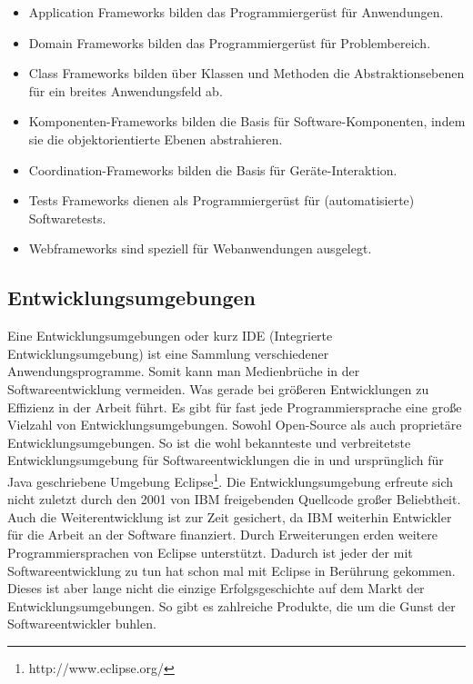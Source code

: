 \begin{itemize}
  \item Application Frameworks 
        \newline bilden das Programmiergerüst für Anwendungen.
  \item Domain Frameworks 
        \newline bilden das Programmiergerüst für Problembereich.
  \item Class Frameworks 
        \newline bilden über Klassen und Methoden die Abstraktionsebenen 
        für ein breites Anwendungsfeld ab.
  \item Komponenten-Frameworks
        \newline bilden die Basis für Software-Komponenten, indem sie die 
        objektorientierte Ebenen abstrahieren.
  \item Coordination-Frameworks
        \newline bilden die Basis für Geräte-Interaktion.
  \item Tests Frameworks
        \newline dienen als Programmiergerüst für (automatisierte) Softwaretests.
  \item Webframeworks
        \newline sind speziell für Webanwendungen ausgelegt.
\end{itemize}

\subsection{Entwicklungsumgebungen}
Eine Entwicklungsumgebungen oder kurz IDE (Integrierte Entwicklungsumgebung)
ist eine Sammlung verschiedener Anwendungsprogramme. Somit kann man 
Medienbrüche in der Softwareentwicklung vermeiden. Was gerade bei größeren
Entwicklungen zu Effizienz in der Arbeit führt.
Es gibt für fast jede Programmiersprache eine große Vielzahl von 
Entwicklungsumgebungen. Sowohl Open-Source als auch proprietäre 
Entwicklungsumgebungen.
So ist die wohl bekannteste und verbreitetste Entwicklungsumgebung für
Softwareentwicklungen die in und ursprünglich für Java geschriebene 
Umgebung Eclipse\footnote{http://www.eclipse.org/}. Die Entwicklungsumgebung
erfreute sich nicht zuletzt durch den 2001 von IBM freigebenden Quellcode
großer Beliebtheit. Auch die Weiterentwicklung ist zur Zeit gesichert, 
da IBM weiterhin Entwickler für die Arbeit an der Software finanziert. 
Durch Erweiterungen erden weitere Programmiersprachen
von Eclipse unterstützt. Dadurch ist jeder der mit Softwareentwicklung
zu tun hat schon mal mit Eclipse in Berührung gekommen.  
Dieses ist aber lange nicht die einzige Erfolgsgeschichte auf dem Markt
der Entwicklungsumgebungen. So gibt es zahlreiche Produkte, die um die 
Gunst der Softwareentwickler buhlen. 

